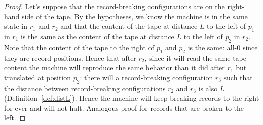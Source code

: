 \begin{proof}
  Let's suppose that the record-breaking configurations are on the right-hand side of the tape. By the hypotheses, we know the machine is in the same state in $r_1$ and $r_2$ and that the content of the tape at distance $L$ to the left of $p_1$ in $r_1$ is the same as the content of the tape at distance $L$ to the left of $p_2$ in $r_2$. Note that the content of the tape to the right of $p_1$ and $p_2$ is the same: all-0 since they are record positions. Hence that after $r_2$, since it will read the same tape content the machine will reproduce the same behavior than it did after $r_1$ but translated at position $p_2$: there will a record-breaking configuration $r_3$ such that the distance between record-breaking configurations $r_2$ and $r_3$ is also $L$ (Definition~\ref{def:distL}). Hence the machine will keep breaking records to the right for ever and will not halt. Analogous proof for records that are broken to the left.
\end{proof}

